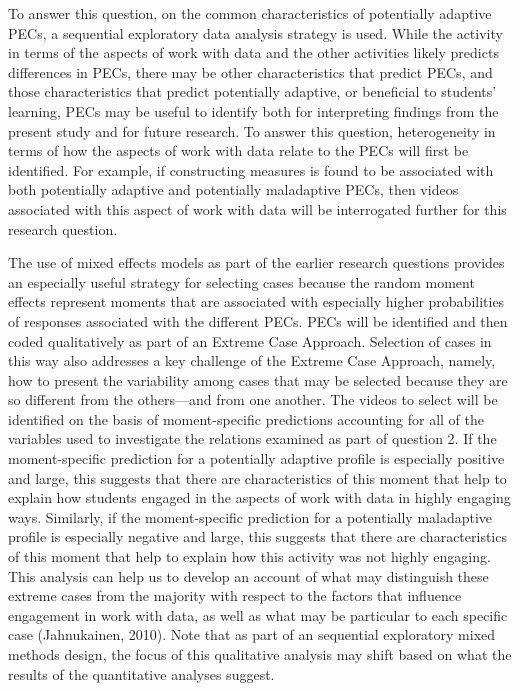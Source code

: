 \documentclass[]{msu-thesis}
\theoremstyle{definition}
\theoremstyle{definition}
\theoremstyle{definition}
\theoremstyle{remark}
\begin{document}
To answer this question, on the common characteristics of potentially
adaptive PECs, a sequential exploratory data analysis strategy is used.
While the activity in terms of the aspects of work with data and the
other activities likely predicts differences in PECs, there may be other
characteristics that predict PECs, and those characteristics that
predict potentially adaptive, or beneficial to students' learning, PECs
may be useful to identify both for interpreting findings from the
present study and for future research. To answer this question,
heterogeneity in terms of how the aspects of work with data relate to
the PECs will first be identified. For example, if constructing measures
is found to be associated with both potentially adaptive and potentially
maladaptive PECs, then videos associated with this aspect of work with
data will be interrogated further for this research question.

The use of mixed effects models as part of the earlier research
questions provides an especially useful strategy for selecting cases
because the random moment effects represent moments that are associated
with especially higher probabilities of responses associated with the
different PECs. PECs will be identified and then coded qualitatively as
part of an Extreme Case Approach. Selection of cases in this way also
addresses a key challenge of the Extreme Case Approach, namely, how to
present the variability among cases that may be selected because they
are so different from the others---and from one another. The videos to
select will be identified on the basis of moment-specific predictions
accounting for all of the variables used to investigate the relations
examined as part of question 2. If the moment-specific prediction for a
potentially adaptive profile is especially positive and large, this
suggests that there are characteristics of this moment that help to
explain how students engaged in the aspects of work with data in highly
engaging ways. Similarly, if the moment-specific prediction for a
potentially maladaptive profile is especially negative and large, this
suggests that there are characteristics of this moment that help to
explain how this activity was not highly engaging. This analysis can
help us to develop an account of what may distinguish these extreme
cases from the majority with respect to the factors that influence
engagement in work with data, as well as what may be particular to each
specific case (Jahnukainen, 2010). Note that as part of an sequential
exploratory mixed methods design, the focus of this qualitative analysis
may shift based on what the results of the quantitative analyses
suggest.
\end{document}
